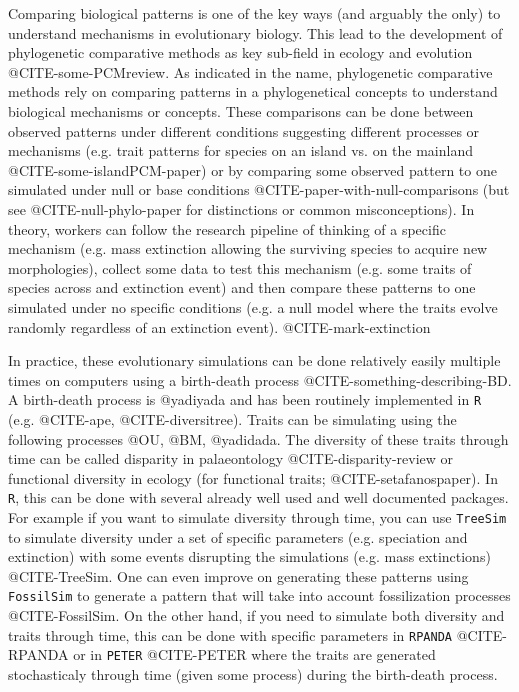 \documentclass[12pt,letterpaper]{article}
\begin{document}
Comparing biological patterns is one of the key ways (and arguably the only) to understand mechanisms in evolutionary biology.
This lead to the development of phylogenetic comparative methods as key sub-field in ecology and evolution @CITE-some-PCMreview.
As indicated in the name, phylogenetic comparative methods rely on comparing patterns in a phylogenetical concepts to understand biological mechanisms or concepts.
These comparisons can be done between observed patterns under different conditions suggesting different processes or mechanisms (e.g. trait patterns for species on an island vs. on the mainland @CITE-some-islandPCM-paper) or by comparing some observed pattern to one simulated under null or base conditions @CITE-paper-with-null-comparisons (but see @CITE-null-phylo-paper for distinctions or common misconceptions).
In theory, workers can follow the research pipeline of thinking of a specific mechanism (e.g. mass extinction allowing the surviving species to acquire new morphologies), collect some data to test this mechanism (e.g. some traits of species across and extinction event) and then compare these patterns to one simulated under no specific conditions (e.g. a null model where the traits evolve randomly regardless of an extinction event). @CITE-mark-extinction

In practice, these evolutionary simulations can be done relatively easily multiple times on computers using a birth-death process @CITE-something-describing-BD.
A birth-death process is @yadiyada and has been routinely implemented in \texttt{R} (e.g. @CITE-ape, @CITE-diversitree).
Traits can be simulating using the following processes @OU, @BM, @yadidada.
The diversity of these traits through time can be called disparity in palaeontology @CITE-disparity-review or functional diversity in ecology (for functional traits; @CITE-setafanospaper).
In \texttt{R}, this can be done with several already well used and well documented packages.
For example if you want to simulate diversity through time, you can use \texttt{TreeSim} to simulate diversity under a set of specific parameters (e.g. speciation and extinction) with some events disrupting the simulations (e.g. mass extinctions) @CITE-TreeSim.
One can even improve on generating these patterns using \texttt{FossilSim} to generate a pattern that will take into account fossilization processes @CITE-FossilSim.
On the other hand, if you need to simulate both diversity and traits through time, this can be done with specific parameters in \texttt{RPANDA} @CITE-RPANDA or in \texttt{PETER} @CITE-PETER where the traits are generated stochasticaly through time (given some process) during the birth-death process.
\end{document}
